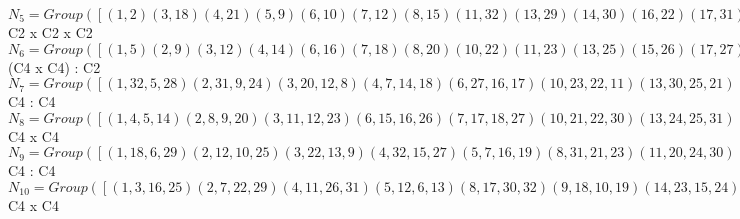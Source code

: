 \documentclass[varwidth=\maxdimen,border=10]{standalone}
\begin{document}
\begin{tabular}
$N_{5} = Group( [ ( 1, 2)( 3,18)( 4,21)( 5, 9)( 6,10)( 7,12)( 8,15)(11,32)(13,29)(14,30)(16,22)(17,31)(19,25)(20,26)(23,28)(24,27), ( 1, 9)( 2, 5)( 3, 7)( 4,30)( 6,22)( 8,26)(10,16)(11,28)(12,18)(13,19)(14,21)(15,20)(17,24)(23,32)(25,29)(27,31), ( 1,10)( 2, 6)( 3,29)( 4, 8)( 5,22)( 7,25)( 9,16)(11,27)(12,19)(13,18)(14,20)(15,21)(17,23)(24,32)(26,30)(28,31) ] )\cong$ C2 x C2 x C2\ \\
$N_{6} = Group( [ ( 1, 5)( 2, 9)( 3,12)( 4,14)( 6,16)( 7,18)( 8,20)(10,22)(11,23)(13,25)(15,26)(17,27)(19,29)(21,30)(24,31)(28,32), ( 1,16)( 2,22)( 3,25)( 4,26)( 5, 6)( 7,29)( 8,30)( 9,10)(11,31)(12,13)(14,15)(17,32)(18,19)(20,21)(23,24)(27,28), ( 1, 2)( 3,18)( 4,21)( 5, 9)( 6,10)( 7,12)( 8,15)(11,32)(13,29)(14,30)(16,22)(17,31)(19,25)(20,26)(23,28)(24,27), ( 1, 3,16,25)( 2, 7,22,29)( 4,11,26,31)( 5,12, 6,13)( 8,17,30,32)( 9,18,10,19)(14,23,15,24)(20,27,21,28), ( 1, 4, 5,14)( 2, 8, 9,20)( 3,11,12,23)( 6,15,16,26)( 7,17,18,27)(10,21,22,30)(13,24,25,31)(19,28,29,32) ] )\cong$ (C4 x C4) : C2\ \\
$N_{7} = Group( [ ( 1,32, 5,28)( 2,31, 9,24)( 3,20,12, 8)( 4, 7,14,18)( 6,27,16,17)(10,23,22,11)(13,30,25,21)(15,19,26,29), ( 1, 5)( 2, 9)( 3,12)( 4,14)( 6,16)( 7,18)( 8,20)(10,22)(11,23)(13,25)(15,26)(17,27)(19,29)(21,30)(24,31)(28,32), ( 1, 3,16,25)( 2, 7,22,29)( 4,11,26,31)( 5,12, 6,13)( 8,17,30,32)( 9,18,10,19)(14,23,15,24)(20,27,21,28) ] )\cong$ C4 : C4\ \\
$N_{8} = Group( [ ( 1, 4, 5,14)( 2, 8, 9,20)( 3,11,12,23)( 6,15,16,26)( 7,17,18,27)(10,21,22,30)(13,24,25,31)(19,28,29,32), ( 1, 5)( 2, 9)( 3,12)( 4,14)( 6,16)( 7,18)( 8,20)(10,22)(11,23)(13,25)(15,26)(17,27)(19,29)(21,30)(24,31)(28,32), ( 1, 3,16,25)( 2, 7,22,29)( 4,11,26,31)( 5,12, 6,13)( 8,17,30,32)( 9,18,10,19)(14,23,15,24)(20,27,21,28) ] )\cong$ C4 x C4\ \\
$N_{9} = Group( [ ( 1,18, 6,29)( 2,12,10,25)( 3,22,13, 9)( 4,32,15,27)( 5, 7,16,19)( 8,31,21,23)(11,20,24,30)(14,28,26,17), ( 1, 6)( 2,10)( 3,13)( 4,15)( 5,16)( 7,19)( 8,21)( 9,22)(11,24)(12,25)(14,26)(17,28)(18,29)(20,30)(23,31)(27,32), ( 1, 4, 5,14)( 2, 8, 9,20)( 3,11,12,23)( 6,15,16,26)( 7,17,18,27)(10,21,22,30)(13,24,25,31)(19,28,29,32) ] )\cong$ C4 : C4\ \\
$N_{10} = Group( [ ( 1, 3,16,25)( 2, 7,22,29)( 4,11,26,31)( 5,12, 6,13)( 8,17,30,32)( 9,18,10,19)(14,23,15,24)(20,27,21,28), ( 1,16)( 2,22)( 3,25)( 4,26)( 5, 6)( 7,29)( 8,30)( 9,10)(11,31)(12,13)(14,15)(17,32)(18,19)(20,21)(23,24)(27,28), ( 1, 4, 5,14)( 2, 8, 9,20)( 3,11,12,23)( 6,15,16,26)( 7,17,18,27)(10,21,22,30)(13,24,25,31)(19,28,29,32) ] )\cong$ C4 x C4\ \\

\end{tabular}
\end{document}
